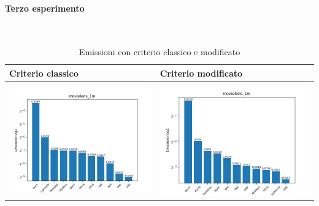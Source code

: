\paragraph{Terzo esperimento} \textcolor{white}{.} \\
\begin{table}[H]
    \centering
    \footnotesize
    \setlength\tabcolsep{0pt}
    \begin{tabularx}{\textwidth}{|X|X|}
        \hline
        \textbf{Criterio classico} & \textbf{Criterio modificato} \\
        \hline
        \includegraphics[width=\linewidth, trim=0 0 0 0]{images/emissions_movielens_1m_40_6_earlyClassic.png} &
        \includegraphics[width=\linewidth, trim=0 0 0 0]{images/emissions_movielens_1m_40_6_earlyModified.png} \\
        \hline
    \end{tabularx}
    \caption{Emissioni con criterio classico e modificato}
    \label{tab:emissions_info}
\end{table}



